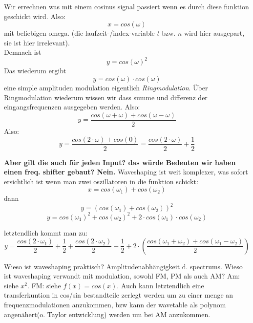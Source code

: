 Wir errechnen was mit einem cosinus signal passiert wenn es durch diese funktion geschickt wird. Also:
\begin{equation}
x = cos(\omega)
\end{equation}
 mit beliebigen omega. (die laufzeit-/index-variable \(t\) bzw. \(n\) wird hier ausgepart, sie ist hier irrelevant).\\
Demnach ist
\begin{equation}
y = cos(\omega)^2
\end{equation}
Das wiederum ergibt
\begin{equation}
y = cos(\omega) \cdot cos(\omega)
\end{equation}
eine simple amplituden modulation eigentlich  \textit{Ringmodulation}. Über Ringmodulation  wiederum wissen wir dass summe und differenz der eingangsfrequenzen ausgegeben werden. Also:
\begin{equation}
y = \frac{cos(\omega+\omega) + cos(\omega-\omega)}{2}
\end{equation}
Also:
\begin{equation}
y = \frac{cos(2 \cdot \omega) + cos(0)}{2} = \frac{cos(2 \cdot \omega )}{2}+\frac{1}{2}
\end{equation}

\textbf{Aber gilt die auch für jeden Input? das würde Bedeuten wir haben einen freq. shifter gebaut? Nein.} Waveshaping ist weit komplexer, was sofort ersichtlich ist wenn man zwei oszillatoren in die funktion schickt:
\begin{equation}
x = cos(\omega_1)+cos(\omega_2) 
\end{equation}
dann
\begin{equation}
y = (cos(\omega_1)+cos(\omega_2) ) ^2
\end{equation}
\begin{equation}
y = cos(\omega_1)^2+cos(\omega_2)^2+2\cdot cos(\omega_1) \cdot cos(\omega_2)
\end{equation}
 
letztendlich kommt man zu:
\begin{equation}
	y = \frac{cos(2 \cdot \omega_1)}{2} + \frac{1}{2} + \frac{cos(2 \cdot \omega_2)}{2} +\frac{1}{2} + 2 \cdot (\frac{cos(\omega_1+\omega_2) + cos(\omega_1-\omega_2)}{2})
\end{equation}



Wieso ist waveshaping praktisch? Amplitudenabhängigkeit d. spectrums. 
Wieso ist waveshaping verwandt mit modulation, sowohl FM, PM als auch AM? Am: siehe \(x^2\). FM: siehe \(f(x)=cos(x)\). Auch kann letztendlich eine transferkuntion in cos/sin bestandteile zerlegt werden um zu einer menge an frequenzmodulationen anzukommen, bzw kann der wavetable als polynom angenähert(o. Taylor entwicklung) werden um bei AM anzukommen.




